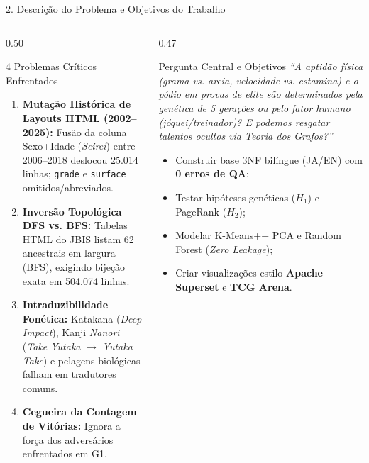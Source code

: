 \documentclass[aspectratio=169,10pt]{beamer}
\begin{document}
\begin{frame}{2. Descrição do Problema e Objetivos do Trabalho}
\begin{columns}[T]
\begin{column}{0.50\textwidth}
\begin{alertblock}{4 Problemas Críticos Enfrentados}
\begin{enumerate}
    \item \textbf{Mutação Histórica de Layouts HTML (2002--2025):} Fusão da coluna Sexo+Idade (\textit{Seirei}) entre 2006--2018 deslocou 25.014 linhas; \texttt{grade} e \texttt{surface} omitidos/abreviados.
    \item \textbf{Inversão Topológica DFS vs. BFS:} Tabelas HTML do JBIS listam 62 ancestrais em largura (BFS), exigindo bijeção exata em 504.074 linhas.
    \item \textbf{Intraduzibilidade Fonética:} Katakana (\textit{Deep Impact}), Kanji \textit{Nanori} (\textit{Take Yutaka} $\to$ \textit{Yutaka Take}) e pelagens biológicas falham em tradutores comuns.
    \item \textbf{Cegueira da Contagem de Vitórias:} Ignora a força dos adversários enfrentados em G1.
\end{enumerate}
\end{alertblock}
\end{column}
\begin{column}{0.47\textwidth}
\begin{exampleblock}{Pergunta Central e Objetivos}
\textit{``A aptidão física (grama vs. areia, velocidade vs. estamina) e o pódio em provas de elite são determinados pela genética de 5 gerações ou pelo fator humano (jóquei/treinador)? E podemos resgatar talentos ocultos via Teoria dos Grafos?''}
\vspace{1.5mm}
\begin{itemize}
    \item Construir base 3NF bilíngue (JA/EN) com \textbf{0 erros de QA};
    \item Testar hipóteses genéticas ($H_1$) e PageRank ($H_2$);
    \item Modelar K-Means++ PCA e Random Forest (\textit{Zero Leakage});
    \item Criar visualizações estilo \textbf{Apache Superset} e \textbf{TCG Arena}.
\end{itemize}
\end{exampleblock}
\end{column}
\end{columns}
\end{frame}
\end{document}
